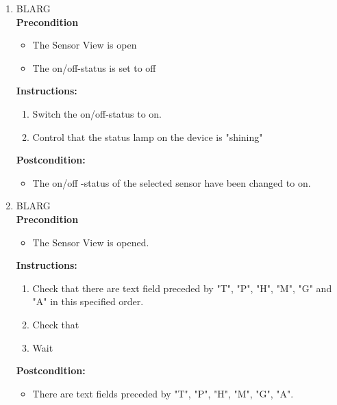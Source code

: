 \documentclass[a4paper]{article}
\newlength{\testlabellength}
\newenvironment{testlist}{\begin{enumerate}[label=\bfseries Instruction \thesubsection.\arabic* , labelindent=0pt, labelwidth=\testlabellength , leftmargin=2cm]}{\end{enumerate}}
\newenvironment{precondition}{
{\color{white}BLARG}\\ 
\textbf{Precondition}
\begin{itemize}[labelindent=0cm, labelwidth=2cm , leftmargin=1cm]
}
{\end{itemize}}
\newenvironment{instruction}{
\textbf{Instructions:}
\begin{enumerate}[label=\bfseries  \arabic*., labelindent=0cm, labelwidth=2cm , leftmargin=1cm]
}
{\end{enumerate}}
\newenvironment{postcondition}{
\textbf{Postcondition:}
\begin{itemize}[labelindent=0cm, labelwidth=2cm , leftmargin=1cm]
}
{\end{itemize}}
\begin{document}
\begin{appendices}
\begin{testlist}
	\item
		\begin{precondition}
			\item The Sensor View is open
			\item The on/off-status is set to off
		\end{precondition}
		\begin{instruction}
			\item Switch the on/off-status to on.  
	  	    \item Control that the status lamp on the device is "shining"
	  	\end{instruction}
	  	\begin{postcondition}
	  		\item The on/off -status of the selected sensor have been changed to on.
	  	\end{postcondition}

	\item
		\begin{precondition}
			\item The Sensor View is opened. 
		\end{precondition}
		\begin{instruction}
			\item Check that there are text field preceded by "T", "P", "H", "M", "G" and "A" in this specified order.
			\item Check that
			\item Wait
		\end{instruction}
		\begin{postcondition}
			\item There are text fields preceded by "T", "P", "H", "M", "G", "A".
		\end{postcondition}


\end{testlist}
\end{appendices}
\end{document}
